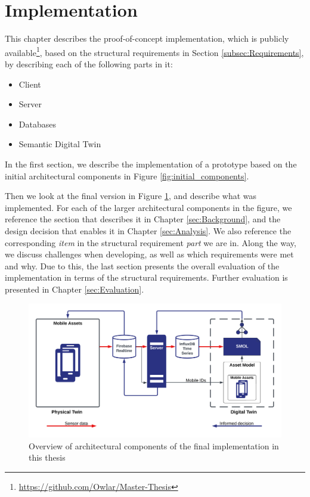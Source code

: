 \documentclass{article}
\begin{document}
\section{Implementation}\label{sec:Implementation}
This chapter describes the proof-of-concept implementation, which is publicly available\footnote{\url{https://github.com/Owlar/Master-Thesis}}, based on the structural requirements in Section \ref{subsec:Requirements}, by describing each of the following parts in it:
\begin{itemize}
    \item Client
    \item Server
    \item Databases
    \item Semantic Digital Twin
\end{itemize}
In the first section, we describe the implementation of a prototype based on the initial architectural components in Figure \ref{fig:initial_components}. 

Then we look at the final version in Figure \ref{fig:components}, and describe what was implemented. For each of the larger architectural components in the figure, we reference the section that describes it in Chapter \ref{sec:Background}, and the design decision that enables it in Chapter \ref{sec:Analysis}. We also reference the corresponding \emph{item} in the structural requirement \emph{part} we are in. Along the way, we discuss challenges when developing, as well as which requirements were met and why. Due to this, the last section presents the overall evaluation of the implementation in terms of the structural requirements. Further evaluation is presented in Chapter \ref{sec:Evaluation}.

\begin{figure}[H]
    \centering
    \includegraphics[scale=0.14]{graphics/thesis_overview.png}
    \caption{Overview of architectural components of the final implementation in this thesis}
    \label{fig:components}
\end{figure}
\end{document}
